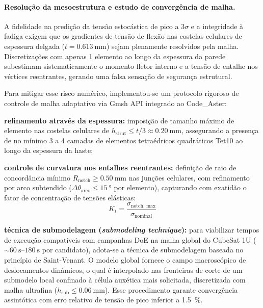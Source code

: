 \paragraph*{Resolução da mesoestrutura e estudo de convergência de malha.}
A fidelidade na predição da tensão estocástica de pico a $3\sigma$ e a integridade à fadiga exigem que os gradientes de tensão de flexão nas costelas celulares de espessura delgada ($t = \SI{0.613}{\milli\metre}$) sejam plenamente resolvidos pela malha. Discretizações com apenas 1 elemento ao longo da espessura da parede subestimam sistematicamente o momento fletor interno e a tensão de entalhe nos vértices reentrantes, gerando uma falsa sensação de segurança estrutural.

Para mitigar esse risco numérico, implementou-se um protocolo rigoroso de controle de malha adaptativo via Gmsh API integrado ao Code\_Aster:
\begin{alineas}
  \item \textbf{refinamento através da espessura:} imposição de tamanho máximo de elemento nas costelas celulares de $h_{\text{strut}} \le t / 3 \approx \SI{0.20}{\milli\metre}$, assegurando a presença de no mínimo 3 a 4 camadas de elementos tetraédricos quadráticos Tet10 ao longo da espessura da haste;
  \item \textbf{controle de curvatura nos entalhes reentrantes:} definição de raio de concordância mínimo $R_{\text{notch}} \ge \SI{0.50}{\milli\metre}$ nas junções celulares, com refinamento por arco subtendido ($\Delta \theta_{\text{arco}} \le \SI{15}{\degree}$ por elemento), capturando com exatidão o fator de concentração de tensões elásticas:
  \begin{equation}
    K_t = \frac{\sigma_{\text{notch, max}}}{\sigma_{\text{nominal}}}
    \label{eq:kt}
  \end{equation}
  \item \textbf{técnica de submodelagem (\textit{submodeling technique}):} para viabilizar tempos de execução compatíveis com campanhas DoE na malha global do CubeSat 1U ($\sim \SIrange{60}{180}{\second}$ por candidato), adota-se a técnica de submodelagem baseada no princípio de Saint-Venant. O modelo global fornece o campo macroscópico de deslocamentos dinâmicos, o qual é interpolado nas fronteiras de corte de um submodelo local confinado à célula auxética mais solicitada, discretizada com malha ultrafina ($h_{\text{sub}} \le \SI{0.06}{\milli\metre}$). Esse procedimento garante convergência assintótica com erro relativo de tensão de pico inferior a \SI{1.5}{\percent}.
\end{alineas}

